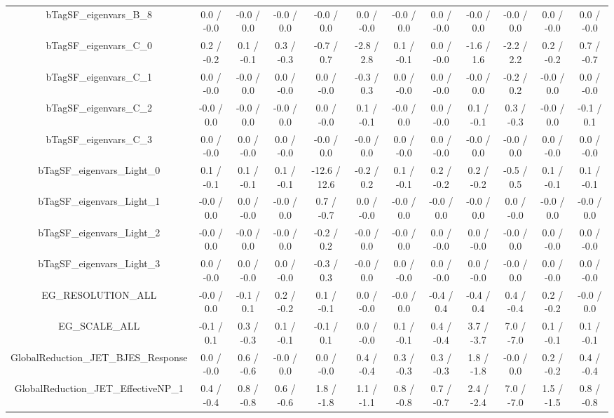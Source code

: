 \begin{table}[htbp]
\begin{center}
\begin{tabular}{|c|c|c|c|c|c|c|c|c|c|c|c|}
  bTagSF_eigenvars_B_8 & 0.0 / -0.0 & -0.0 / 0.0 & -0.0 / 0.0 & -0.0 / 0.0 & 0.0 / -0.0 & -0.0 / 0.0 & 0.0 / -0.0 & -0.0 / 0.0 & -0.0 / 0.0 & 0.0 / -0.0 & 0.0 / -0.0 \\ 
  bTagSF_eigenvars_C_0 & 0.2 / -0.2 & 0.1 / -0.1 & 0.3 / -0.3 & -0.7 / 0.7 & -2.8 / 2.8 & 0.1 / -0.1 & 0.0 / -0.0 & -1.6 / 1.6 & -2.2 / 2.2 & 0.2 / -0.2 & 0.7 / -0.7 \\ 
  bTagSF_eigenvars_C_1 & 0.0 / -0.0 & -0.0 / 0.0 & 0.0 / -0.0 & 0.0 / -0.0 & -0.3 / 0.3 & 0.0 / -0.0 & 0.0 / -0.0 & -0.0 / 0.0 & -0.2 / 0.2 & -0.0 / 0.0 & 0.0 / -0.0 \\ 
  bTagSF_eigenvars_C_2 & -0.0 / 0.0 & -0.0 / 0.0 & -0.0 / 0.0 & 0.0 / -0.0 & 0.1 / -0.1 & -0.0 / 0.0 & 0.0 / -0.0 & 0.1 / -0.1 & 0.3 / -0.3 & -0.0 / 0.0 & -0.1 / 0.1 \\ 
  bTagSF_eigenvars_C_3 & 0.0 / -0.0 & 0.0 / -0.0 & 0.0 / -0.0 & -0.0 / 0.0 & -0.0 / 0.0 & 0.0 / -0.0 & 0.0 / -0.0 & -0.0 / 0.0 & -0.0 / 0.0 & 0.0 / -0.0 & 0.0 / -0.0 \\ 
  bTagSF_eigenvars_Light_0 & 0.1 / -0.1 & 0.1 / -0.1 & 0.1 / -0.1 & -12.6 / 12.6 & -0.2 / 0.2 & 0.1 / -0.1 & 0.2 / -0.2 & 0.2 / -0.2 & -0.5 / 0.5 & 0.1 / -0.1 & 0.1 / -0.1 \\ 
  bTagSF_eigenvars_Light_1 & -0.0 / 0.0 & 0.0 / -0.0 & -0.0 / 0.0 & 0.7 / -0.7 & 0.0 / -0.0 & -0.0 / 0.0 & -0.0 / 0.0 & -0.0 / 0.0 & 0.0 / -0.0 & -0.0 / 0.0 & -0.0 / 0.0 \\ 
  bTagSF_eigenvars_Light_2 & -0.0 / 0.0 & -0.0 / 0.0 & -0.0 / 0.0 & -0.2 / 0.2 & -0.0 / 0.0 & -0.0 / 0.0 & 0.0 / -0.0 & 0.0 / -0.0 & -0.0 / 0.0 & 0.0 / -0.0 & 0.0 / -0.0 \\ 
  bTagSF_eigenvars_Light_3 & 0.0 / -0.0 & 0.0 / -0.0 & 0.0 / -0.0 & -0.3 / 0.3 & -0.0 / 0.0 & 0.0 / -0.0 & 0.0 / -0.0 & 0.0 / -0.0 & -0.0 / 0.0 & 0.0 / -0.0 & 0.0 / -0.0 \\ 
  EG_RESOLUTION_ALL & -0.0 / 0.0 & -0.1 / 0.1 & 0.2 / -0.2 & 0.1 / -0.1 & 0.0 / -0.0 & -0.0 / 0.0 & -0.4 / 0.4 & -0.4 / 0.4 & 0.4 / -0.4 & 0.2 / -0.2 & -0.0 / 0.0 \\ 
  EG_SCALE_ALL & -0.1 / 0.1 & 0.3 / -0.3 & 0.1 / -0.1 & -0.1 / 0.1 & 0.0 / -0.0 & 0.1 / -0.1 & 0.4 / -0.4 & 3.7 / -3.7 & 7.0 / -7.0 & 0.1 / -0.1 & 0.1 / -0.1 \\ 
  GlobalReduction_JET_BJES_Response & 0.0 / -0.0 & 0.6 / -0.6 & -0.0 / 0.0 & 0.0 / -0.0 & 0.4 / -0.4 & 0.3 / -0.3 & 0.3 / -0.3 & 1.8 / -1.8 & -0.0 / 0.0 & 0.2 / -0.2 & 0.4 / -0.4 \\ 
  GlobalReduction_JET_EffectiveNP_1 & 0.4 / -0.4 & 0.8 / -0.8 & 0.6 / -0.6 & 1.8 / -1.8 & 1.1 / -1.1 & 0.8 / -0.8 & 0.7 / -0.7 & 2.4 / -2.4 & 7.0 / -7.0 & 1.5 / -1.5 & 0.8 / -0.8 \\ 

\end{tabular}
\end{center}
\end{table}

